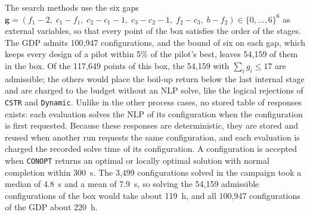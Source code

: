 \documentclass{article}
\begin{document}
The search methods use the six gaps \(\mathbf g=(f_1-2,\;c_1-f_1,\;c_2-c_1-1,\;c_3-c_2-1,\;f_2-c_3,\;b-f_2)\in\{0,\ldots,6\}^6\) as external variables, so that every point of the box satisfies the order of the stages.
The GDP admits 100,947 configurations, and the bound of six on each gap, which keeps every design of a pilot within 5\% of the pilot's best, leaves 54,159 of them in the box.
Of the 117,649 points of this box, the 54,159 with \(\sum_i g_i\le 17\) are admissible; the others would place the boil-up return below the last internal stage and are charged to the budget without an NLP solve, like the logical rejections of \texttt{CSTR} and \texttt{Dynamic}.
Unlike in the other process cases, no stored table of responses exists: each evaluation solves the NLP of its configuration when the configuration is first requested.
Because these responses are deterministic, they are stored and reused when another run requests the same configuration, and each evaluation is charged the recorded solve time of its configuration.
A configuration is accepted when \texttt{CONOPT} returns an optimal or locally optimal solution with normal completion within 300~s.
The 3,499 configurations solved in the campaign took a median of 4.8~s and a mean of 7.9~s, so solving the 54,159 admissible configurations of the box would take about 119~h, and all 100,947 configurations of the GDP about 220~h.
\end{document}
